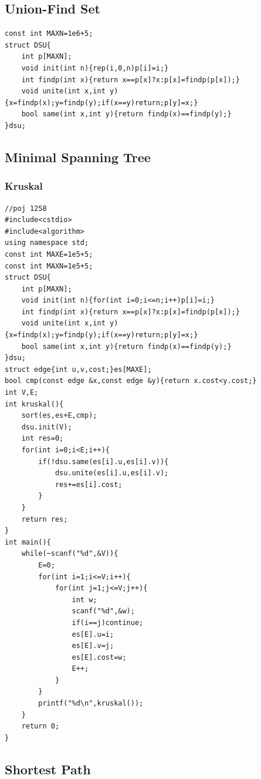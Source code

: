 \documentclass[twoside]{article}
\begin{document}
\subsection{Union-Find Set}
\begin{lstlisting}
const int MAXN=1e6+5;
struct DSU{
    int p[MAXN];
    void init(int n){rep(i,0,n)p[i]=i;}
    int findp(int x){return x==p[x]?x:p[x]=findp(p[x]);}
    void unite(int x,int y){x=findp(x);y=findp(y);if(x==y)return;p[y]=x;}
    bool same(int x,int y){return findp(x)==findp(y);}
}dsu;
\end{lstlisting}
\subsection{Minimal Spanning Tree}
\subsubsection{Kruskal}
\begin{lstlisting}
//poj 1258
#include<cstdio>
#include<algorithm>
using namespace std;
const int MAXE=1e5+5;
const int MAXN=1e5+5;
struct DSU{
    int p[MAXN];
    void init(int n){for(int i=0;i<=n;i++)p[i]=i;}
    int findp(int x){return x==p[x]?x:p[x]=findp(p[x]);}
    void unite(int x,int y){x=findp(x);y=findp(y);if(x==y)return;p[y]=x;}
    bool same(int x,int y){return findp(x)==findp(y);}
}dsu;
struct edge{int u,v,cost;}es[MAXE];
bool cmp(const edge &x,const edge &y){return x.cost<y.cost;}
int V,E;
int kruskal(){
    sort(es,es+E,cmp);
    dsu.init(V);
    int res=0;
    for(int i=0;i<E;i++){
        if(!dsu.same(es[i].u,es[i].v)){
            dsu.unite(es[i].u,es[i].v);
            res+=es[i].cost;
        }
    }
    return res;
}
int main(){
    while(~scanf("%d",&V)){
        E=0;
        for(int i=1;i<=V;i++){
            for(int j=1;j<=V;j++){
                int w;
                scanf("%d",&w);
                if(i==j)continue;
                es[E].u=i;
                es[E].v=j;
                es[E].cost=w;
                E++;
            }
        }
        printf("%d\n",kruskal());
    }
    return 0;
}
\end{lstlisting}
\subsection{Shortest Path}
\end{document}
